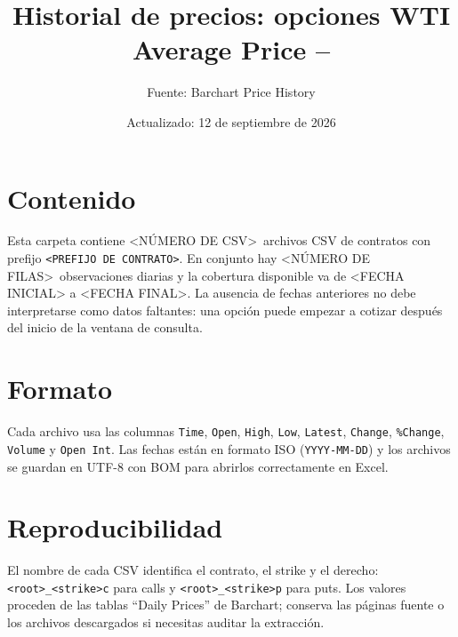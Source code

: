 \documentclass[11pt]{article}
\title{Historial de precios: opciones WTI Average Price -- \Mes}
\author{Fuente: Barchart Price History}
\date{Actualizado: 12 de septiembre de 2026}
\newcommand{\Prefijo}{<PREFIJO DE CONTRATO>}
\newcommand{\Archivos}{<NÚMERO DE CSV>}
\newcommand{\Filas}{<NÚMERO DE FILAS>}
\newcommand{\Cobertura}{<FECHA INICIAL> a <FECHA FINAL>}
\begin{document}
\maketitle

\section*{Contenido}
Esta carpeta contiene \Archivos\ archivos CSV de contratos con prefijo
\texttt{\Prefijo}. En conjunto hay \Filas\ observaciones diarias y la cobertura
disponible va de \Cobertura. La ausencia de fechas anteriores no debe
interpretarse como datos faltantes: una opción puede empezar a cotizar después
del inicio de la ventana de consulta.

\section*{Formato}
Cada archivo usa las columnas \texttt{Time}, \texttt{Open}, \texttt{High},
\texttt{Low}, \texttt{Latest}, \texttt{Change}, \texttt{\%Change},
\texttt{Volume} y \texttt{Open Int}. Las fechas están en formato ISO
(\texttt{YYYY-MM-DD}) y los archivos se guardan en UTF-8 con BOM para abrirlos
correctamente en Excel.

\section*{Reproducibilidad}
El nombre de cada CSV identifica el contrato, el strike y el derecho:
\texttt{<root>\_<strike>c} para calls y \texttt{<root>\_<strike>p} para puts.
Los valores proceden de las tablas ``Daily Prices'' de Barchart; conserva las
páginas fuente o los archivos descargados si necesitas auditar la extracción.
\end{document}
